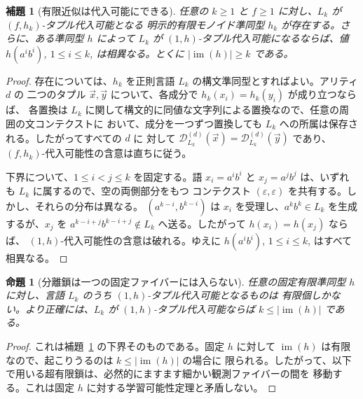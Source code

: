 \documentclass[11pt,a4paper]{ltjsarticle}
\newtheorem{lemma}[theorem]{補題}
\newtheorem{proposition}[theorem]{命題}
\theoremstyle{remark}
\newcommand{\D}{\mathcal{D}}
\newcommand{\tuple}[1]{\vec{#1}}
\newcommand{\eps}{\varepsilon}
\begin{document}
\begin{lemma}[有限近似は代入可能にできる]
\label{lem:finite-approximants-substitutable}
任意の \(k\ge1\) と \(f\ge1\) に対し、\(L_k\) が \((f,h_k)\)-タプル代入可能となる
明示的有限モノイド準同型 \(h_k\) が存在する。さらに、ある準同型 \(h\) によって \(L_k\) が
\((1,h)\)-タプル代入可能になるならば、値
\(h(a^i b^i)\), \(1\le i\le k\), は相異なる。とくに
\(|\operatorname{im}(h)|\ge k\) である。
\end{lemma}

\begin{proof}
存在については、\(h_k\) を正則言語 \(L_k\) の構文準同型とすればよい。アリティ \(d\) の
二つのタプル \(\tuple x,\tuple y\) について、各成分で \(h_k(x_i)=h_k(y_i)\) が成り立つならば、
各置換は \(L_k\) に関して構文的に同値な文字列による置換なので、任意の周囲の文コンテクストに
おいて、成分を一つずつ置換しても \(L_k\) への所属は保存される。したがってすべての \(d\) に
対して \(\D_{L_k}^{(d)}(\tuple x)=\D_{L_k}^{(d)}(\tuple y)\) であり、
\((f,h_k)\)-代入可能性の含意は直ちに従う。

下界について、\(1\le i<j\le k\) を固定する。語
\(x_i=a^i b^i\) と \(x_j=a^j b^j\) は、いずれも \(L_k\) に属するので、空の両側部分をもつ
コンテクスト \((\eps,\eps)\) を共有する。しかし、それらの分布は異なる。
\((a^{k-i},b^{k-i})\) は \(x_i\) を受理し、\(a^k b^k\in L_k\) を生成するが、\(x_j\) を
\(a^{k-i+j}b^{k-i+j}\notin L_k\) へ送る。したがって \(h(x_i)=h(x_j)\) ならば、
\((1,h)\)-代入可能性の含意は破れる。ゆえに
\(h(a^i b^i)\), \(1\le i\le k\), はすべて相異なる。
\end{proof}

\begin{proposition}[分離鎖は一つの固定ファイバーには入らない]
\label{prop:separating-chain-not-one-fiber}
任意の固定有限準同型 \(h\) に対し、言語 \(L_k\) のうち \((1,h)\)-タプル代入可能となるものは
有限個しかない。より正確には、\(L_k\) が \((1,h)\)-タプル代入可能ならば
\(k\le|\operatorname{im}(h)|\) である。
\end{proposition}

\begin{proof}
これは補題~\ref{lem:finite-approximants-substitutable} の下界そのものである。固定 \(h\) に対して
\(\operatorname{im}(h)\) は有限なので、起こりうるのは \(k\le|\operatorname{im}(h)|\) の場合に
限られる。したがって、以下で用いる超有限鎖は、必然的にますます細かい観測ファイバーの間を
移動する。これは固定 \(h\) に対する学習可能性定理と矛盾しない。
\end{proof}
\end{document}
